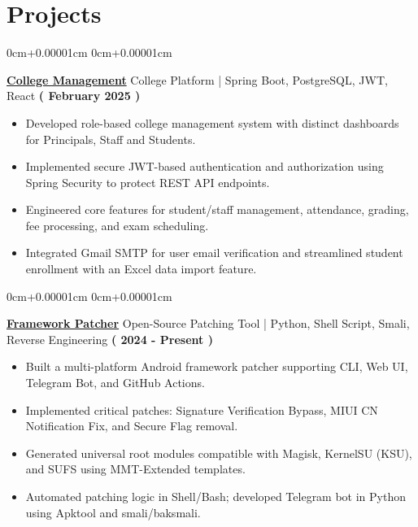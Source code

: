 \documentclass[10pt,a4paper]{article}
\newenvironment{highlights}{
    \begin{itemize}[
        topsep=0.10cm,
        parsep=0.10cm,
        partopsep=0pt,
        itemsep=0pt,
        leftmargin=10pt,
    ]
    }{
    \end{itemize}
}
\newenvironment{onecolentry}{
    \begin{adjustwidth}{
        0cm+0.00001cm
    }{
        0cm+0.00001cm
    }
    }{
    \end{adjustwidth}
}
\begin{document}
    \section{Projects}\label{sec:projects}
    \begin{onecolentry}
        \textbf{\href{https://github.com/jefino9488/college-management-server}{College Management}} College Platform | Spring Boot, PostgreSQL, JWT, React \hfill \textbf{( February 2025 )} \\
        \begin{highlights}
            \item Developed role-based college management system with distinct dashboards for Principals, Staff and Students. \\
            \item Implemented secure JWT-based authentication and authorization using Spring Security to protect REST API endpoints. \\
            \item Engineered core features for student/staff management, attendance, grading, fee processing, and exam scheduling. \\
            \item Integrated Gmail SMTP for user email verification and streamlined student enrollment with an Excel data import feature. \\
        \end{highlights}
    \end{onecolentry}
    \vspace{0.1cm}
    \begin{onecolentry}
        \textbf{\href{https://github.com/Jefino9488/FrameworkPatcherV2}{Framework Patcher}} Open-Source Patching Tool | Python, Shell Script, Smali, Reverse Engineering \hfill \textbf{( 2024 - Present )} \\
        \begin{highlights}
            \item Built a multi-platform Android framework patcher supporting CLI, Web UI, Telegram Bot, and GitHub Actions.
            \item Implemented critical patches: Signature Verification Bypass, MIUI CN Notification Fix, and Secure Flag removal.
            \item Generated universal root modules compatible with Magisk, KernelSU (KSU), and SUFS using MMT-Extended templates.
            \item Automated patching logic in Shell/Bash; developed Telegram bot in Python using Apktool and smali/baksmali.
        \end{highlights}
    \end{onecolentry}
\end{document}
